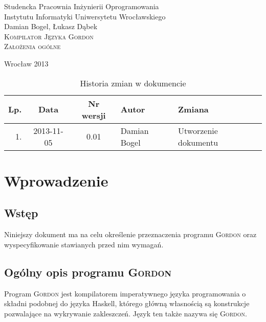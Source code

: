 \documentclass{documentation}
\begin{document}
\begin{titlepage}
\begin{center}
Studencka Pracownia Inżynierii Oprogramowania\\
Instytutu Informatyki Uniwersytetu Wrocławskiego\\[6cm]

Damian Bogel, Łukasz Dąbek\\[1cm]
\textsc{\LARGE Kompilator Języka Gordon}\\[0.5cm]
\textsc{\large Założenia ogólne}

\vfill
Wrocław 2013 \\[2.5cm]

\end{center}
\end{titlepage}

\newpage
\begin{table}
	\centering
    \captionsetup{name=Tabela}
	\caption{Historia zmian w dokumencie}
		\begin{tabular}{|r|c|c|l|l|}
		\hline
		Lp.  & Data       & Nr wersji & Autor                 & Zmiana \\ \hline
		1.   & 2013-11-05 & 0.01 & Damian Bogel & Utworzenie dokumentu \\ \hline
	\end{tabular}
\end{table}
\newpage

\tableofcontents
\setcounter{page}{2}

\newpage

\section{Wprowadzenie}
\subsection{Wstęp}
\noindent Niniejszy dokument ma na celu określenie przeznaczenia programu \textsc{Gordon} oraz wyspecyfikowanie stawianych przed nim wymagań.

\subsection{Ogólny opis programu \textsc{Gordon}}
\noindent Program \textsc{Gordon} jest kompilatorem imperatywnego języka programowania o składni podobnej do języka Haskell, którego główną własnością są konstrukcje pozwalające na wykrywanie zakleszczeń. Język ten także nazywa się \textsc{Gordon}.
\end{document}
